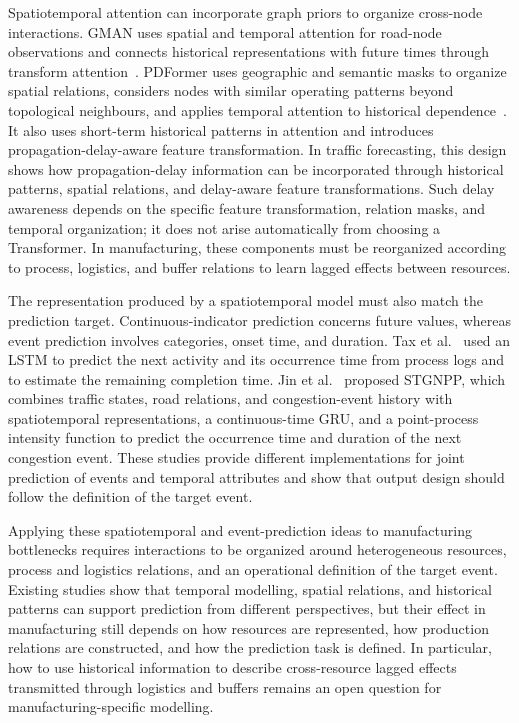 \documentclass[a4paper,fleqn]{cas-dc}
\begin{document}
Spatiotemporal attention can incorporate graph priors to organize cross-node interactions. GMAN uses spatial and temporal attention for road-node observations and connects historical representations with future times through transform attention~\cite{zheng2020gman}. PDFormer uses geographic and semantic masks to organize spatial relations, considers nodes with similar operating patterns beyond topological neighbours, and applies temporal attention to historical dependence~\cite{jiang2023pdformer}. It also uses short-term historical patterns in attention and introduces propagation-delay-aware feature transformation. In traffic forecasting, this design shows how propagation-delay information can be incorporated through historical patterns, spatial relations, and delay-aware feature transformations. Such delay awareness depends on the specific feature transformation, relation masks, and temporal organization; it does not arise automatically from choosing a Transformer. In manufacturing, these components must be reorganized according to process, logistics, and buffer relations to learn lagged effects between resources.


The representation produced by a spatiotemporal model must also match the prediction target. Continuous-indicator prediction concerns future values, whereas event prediction involves categories, onset time, and duration. Tax et al.~\cite{tax2017predictive} used an LSTM to predict the next activity and its occurrence time from process logs and to estimate the remaining completion time. Jin et al.~\cite{jin2023stgnpp} proposed STGNPP, which combines traffic states, road relations, and congestion-event history with spatiotemporal representations, a continuous-time GRU, and a point-process intensity function to predict the occurrence time and duration of the next congestion event. These studies provide different implementations for joint prediction of events and temporal attributes and show that output design should follow the definition of the target event.


Applying these spatiotemporal and event-prediction ideas to manufacturing bottlenecks requires interactions to be organized around heterogeneous resources, process and logistics relations, and an operational definition of the target event. Existing studies show that temporal modelling, spatial relations, and historical patterns can support prediction from different perspectives, but their effect in manufacturing still depends on how resources are represented, how production relations are constructed, and how the prediction task is defined. In particular, how to use historical information to describe cross-resource lagged effects transmitted through logistics and buffers remains an open question for manufacturing-specific modelling.
\end{document}
